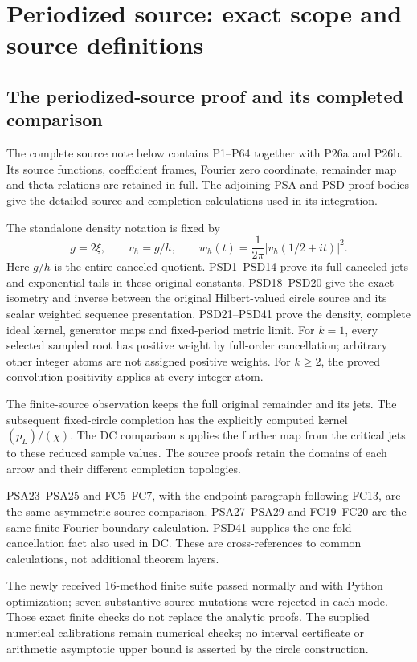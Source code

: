 \begingroup

\section{Periodized source: exact scope and source definitions}


\subsection{The periodized-source proof and its completed comparison}
\label{sec:periodized-source-reader-scope}

The complete source note below contains P1--P64 together with P26a
and P26b. Its source functions, coefficient frames, Fourier zero
coordinate, remainder map and theta relations are retained in full.
The adjoining PSA and PSD proof bodies give the detailed source and
completion calculations used in its integration.

The standalone density notation is fixed by
\[
 g=2\xi,\qquad v_h=g/h,\qquad
 w_h(t)=\frac1{2\pi}|v_h(1/2+it)|^2.
\]
Here $g/h$ is the entire canceled quotient. PSD1--PSD14 prove its
full canceled jets and exponential tails in these original constants.
PSD18--PSD20 give the exact isometry and inverse between the original
Hilbert-valued circle source and its scalar weighted sequence
presentation. PSD21--PSD41 prove the density, complete ideal kernel,
generator maps and fixed-period metric limit. For $k=1$, every selected
sampled root has positive weight by full-order cancellation; arbitrary
other integer atoms are not assigned positive weights. For $k\ge2$,
the proved convolution positivity applies at every integer atom.

The finite-source observation keeps the full original remainder and
its jets. The subsequent fixed-circle completion has the explicitly
computed kernel $(p_L)/(\chi)$. The DC comparison supplies the further
map from the critical jets to these reduced sample values. The source
proofs retain the domains of each arrow and their different completion
topologies.

PSA23--PSA25 and FC5--FC7, with the endpoint paragraph following
FC13, are the same asymmetric source comparison. PSA27--PSA29 and
FC19--FC20 are the same finite Fourier boundary calculation. PSD41
supplies the one-fold cancellation fact also used in DC. These are
cross-references to common calculations, not additional theorem layers.

The newly received 16-method finite suite passed normally and with
Python optimization; seven substantive source mutations were rejected
in each mode. Those exact finite checks do not replace the analytic
proofs. The supplied numerical calibrations remain numerical checks;
no interval certificate or arithmetic asymptotic upper bound is
asserted by the circle construction.


\endgroup
